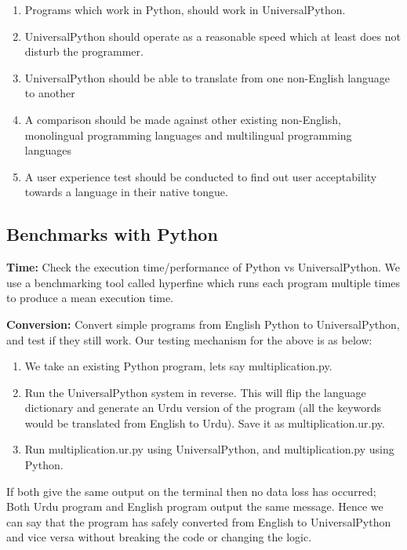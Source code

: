 \documentclass[conference]{IEEEtran}
\begin{document}
\begin{enumerate}

\item Programs which work in Python, should work in UniversalPython.

\item UniversalPython should operate as a reasonable speed which at least does not disturb the programmer.

\item UniversalPython should be able to translate from one non-English language to another

\item A comparison should be made against other existing non-English, monolingual programming languages and multilingual programming languages

\item A user experience test should be conducted to find out user acceptability towards a language in their native tongue.

\end{enumerate}

\subsection{Benchmarks with Python}\label{BB}

\textbf{Time:} Check the execution time/performance of Python vs UniversalPython. We use a benchmarking tool called hyperfine which runs each program multiple times to produce a mean execution time.

\textbf{Conversion:} Convert simple programs from English Python to UniversalPython, and test if they still work. Our testing mechanism for the above is as below:
\begin{enumerate}
\item We take an existing Python program, lets say multiplication.py.

\item Run the UniversalPython system in reverse. This will flip the language dictionary and generate an Urdu version of the program (all the keywords would be translated from English to Urdu). Save it as multiplication.ur.py.

\item Run multiplication.ur.py using UniversalPython, and multiplication.py using Python.
\end{enumerate}
If both give the same output on the terminal then no data loss has occurred; Both Urdu program and English program output the same message. Hence we can say that the program has safely converted from English to UniversalPython and vice versa without breaking the code or changing the logic.
\end{document}
